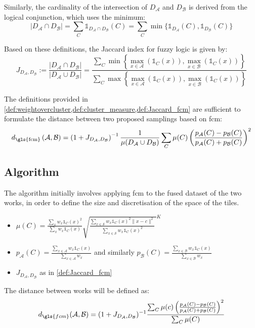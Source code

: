 \begin{toReview}
\begin{definition}
	\noindent Similarly, the cardinality of the intersection of $D_\mathcal{A}$ and $D_\mathcal{B}$ is derived from the logical conjunction, which uses the minimum:
	$$|D_\mathcal{A} \cap D_\mathcal{B}| = \sum_C \mathds{1}_{D_\mathcal{A} \cap D_\mathcal{B}}(C) = \sum_C \min\{\mathds{1}_{D_\mathcal{A}}(C), \mathds{1}_{D_\mathcal{B}}(C)\} $$

	\noindent Based on these definitions, the Jaccard index for fuzzy logic is given by:
	\begin{equation*}
		J_{D_\mathcal{A},D_\mathcal{B}} :=
		\frac{
			\left|D_\mathcal{A} \cap D_\mathcal{B}\right|
		}{
			\left|D_\mathcal{A} \cup D_\mathcal{B}\right|
		}
		= \frac{
			\sum_C \min \left\{
				\max_{x\in \mathcal{A}}\left(
					\mathds{1}_{C}(x)
				\right), \max_{x\in \mathcal{B}}\left(
					\mathds{1}_{C}(x)
				\right)
			\right\}
		}{
			\sum_C \max\left\{
				\max_{x\in \mathcal{A}}\left(
					\mathds{1}_{C}(x)
				\right),\max_{x\in \mathcal{B}}\left(
					\mathds{1}_{C}(x)
				\right)
			\right\}
		}
	\end{equation*}
\end{definition}
\end{toReview}

\noindent The definitions provided in \cref{def:weightovercluster,def:cluster_measure,def:Jaccard_fcm} are sufficient to formulate the distance between two proposed samplings based on \gls{fcm}:
\[
d_{\text{\gls{fcm}}}\left(\mathcal{A},\mathcal{B}\right) = \left(1+J_{D_\mathcal{A},D_\mathcal{B}}\right)^{-1}\frac{1}{\mu(D_\mathcal{A} \cup D_\mathcal{B})} \sum_C \mu(C) \left(\frac{p_\mathcal{A}(C) - p_\mathcal{B}(C)}{p_\mathcal{A}(C) + p_\mathcal{B}(C)}\right)^2
\]

\subsection{Algorithm}
The algorithm initially involves applying \gls{fcm} to the fused dataset of the two works, in order to define the size and discretisation of the space of the tiles.
\begin{itemize}
	\item $ \mu(C) = \frac{\sum_x w_x\mathds{1}_{C}(x)^2}{\sum_x w_x\mathds{1}_C(x)}\sqrt{\frac{\sum_{x\in\mathcal{S}} w_x\mathds{1}_C(x)^2 \|x-c\|^2}{\sum_{x\in\mathcal{S}}w_x \mathds{1}_C(x)^2}\,}^K $
	\item $ p_\mathcal{A}(C) = \frac{\sum_{x\in \mathcal{A}} w_x\mathds{1}_C(x)}{\sum_{x\in \mathcal{A}}w_x} $ and similarly $ p_\mathcal{B}(C) = \frac{\sum_{x\in \mathcal{B}} w_x\mathds{1}_C(x)}{\sum_{x\in \mathcal{B}}w_x} $
	\item $ J_{D_\mathcal{A}, D_\mathcal{B}} $ as in \cref{def:Jaccard_fcm}
\end{itemize}
The distance between works will be defined as:
\begin{equation}
\label{eq:fuzzy_distance}
	d_{\gls{fcm}}(\mathcal{A}, \mathcal{B}) = (1 + J_{D_\mathcal{A}, D_\mathcal{B}})^{-1}\frac{\sum_C  \mu(c)\left(\frac{p_\mathcal{A}(C)-p_\mathcal{B}(C)}{p_\mathcal{A}(C)+p_\mathcal{B}(C)}\right)^2}{\sum_C \mu(C)}
\end{equation}


